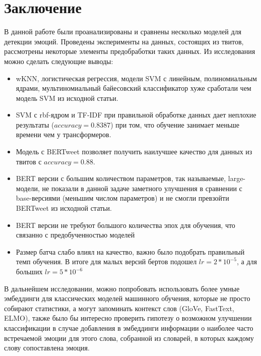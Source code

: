 \documentclass{article}
\begin{document}
\section{Заключение}
В данной работе были проанализированы и сравнены несколько моделей для детекции эмоций. Проведены эксперименты на данных, состоящих из твитов, рассмотрены некоторые элементы предобработки таких данных. Из исследования можно сделать следующие выводы:
\begin{itemize}
    \item wKNN, логистическая регрессия, модели SVM с линейным, полиномиальным ядрами, мультиномиальный байесовский классификатор хуже сработали чем модель SVM из исходной статьи.
    \item SVM с rbf-ядром и TF-IDF при правильной обработке данных дает неплохие результаты ($accuracy = 0.8387$) при том, что обучение занимает меньше времени чем у трансформеров.
    \item Модель с BERTweet позволяет получить наилучшее качество для данных из твитов с $accuracy = 0.88$.
    \item BERT версии с большим количеством параметров, так называемые, large-модели, не показали в данной задаче  заметного улучшения в сравнении с base-версиями (меньшим числом параметров) и не смогли превзойти BERTweet из исходной статьи.
    \item BERT версии не требуют большого количества эпох для обучения, что связанно с предобученностью моделей
    \item Размер батча слабо влиял на качество, важно было подобрать правильный темп обучения. В итоге для малых версий бертов подошел $lr = 2 * 10^{-5}$, а для больших $lr = 5 * 10^{-6}$
\end{itemize}

В дальнейшем исследовании, можно попробовать использовать более умные эмбеддинги для классических моделей машинного обучения, которые не просто собирают статистики, а могут запоминать контекст слов (GloVe, FastText, ELMO), также было бы интересно проверить гипотезу о возможном улучшении классификации в случае добавления в эмбеддинги информации о наиболее часто встречаемой эмоции для этого слова, собранной из словарей, в которых каждому слову сопоставлена эмоция. 
\newpage


\end{document}
